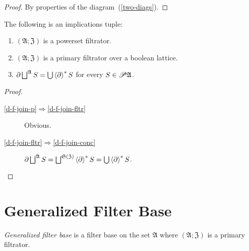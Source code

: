 \begin{proof}
By properties of the diagram~(\ref{two-diags}).\end{proof}
\begin{cor}
\label{d-f-join}The following is an implications tuple:
\begin{enumerate}
\item \label{d-f-join-p}$(\mathfrak{A};\mathfrak{Z})$ is a powerset filtrator.
\item \label{d-f-join-fltr}$(\mathfrak{A};\mathfrak{Z})$ is a primary
filtrator over a boolean lattice.
\item \label{d-f-join-conc}$\partial\bigsqcup^{\mathfrak{A}}S=\bigcup\left\langle \partial\right\rangle ^{\ast}S$
for every $S\in\mathscr{P}\mathfrak{A}$.
\end{enumerate}
\end{cor}
\begin{proof}
~
\begin{description}
\item [{\ref{d-f-join-p}$\Rightarrow$\ref{d-f-join-fltr}}] Obvious.
\item [{\ref{d-f-join-fltr}$\Rightarrow$\ref{d-f-join-conc}}] $\partial\bigsqcup^{\mathfrak{A}}S=\bigsqcup^{\mathfrak{S}(\mathfrak{Z})}\left\langle \partial\right\rangle ^{\ast}S=\bigcup\left\langle \partial\right\rangle ^{\ast}S$.
\end{description}
\end{proof}

\section{Generalized Filter Base}
\begin{defn}
\emph{Generalized filter base} is
a filter base on the set $\mathfrak{A}$ where $(\mathfrak{A};\mathfrak{Z})$
is a primary filtrator.
\end{defn}

